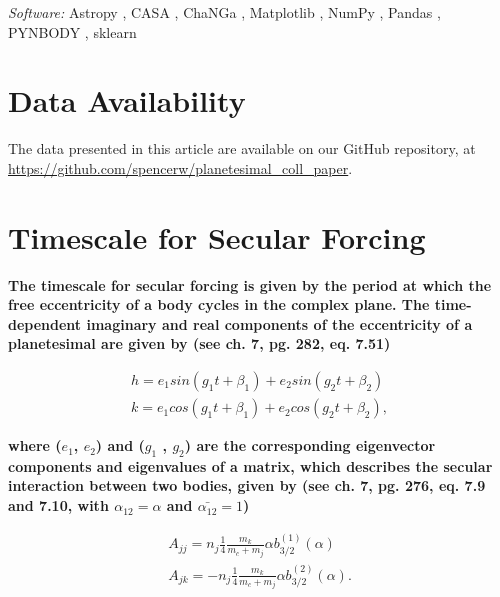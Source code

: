 \documentclass[fleqn,usenatbib]{mnras}
\begin{document}
\textit{Software:} Astropy \citep{2013A&A...558A..33A}, {\sc CASA} \citep{2007ASPC..376..127M}, {\sc ChaNGa} \citep{2008IEEEpds...ChaNGa, 2015AphCom..2..1}, Matplotlib 
\citep{2007CSE.....9...90H}, NumPy \citep{2011CSE....13b..22V}, Pandas \citep{mckinney-proc-scipy-2010}, {\sc PYNBODY} \citep{2013ascl.soft05002P}, {\sc sklearn} \citep{scikit-learn}

\section*{Data Availability}
The data presented in this article are available on our GitHub repository, at \url{https://github.com/spencerw/planetesimal_coll_paper}.




\appendix
\section{Timescale for Secular Forcing}\label{sec:sec_forcing_timescale}

\textbf{The timescale for secular forcing is given by the period at which the free eccentricity of a body cycles in the complex plane. The time-dependent imaginary and real components of 
the eccentricity of a planetesimal are given by \citet{1999ssd..book.....M} (see ch. 7, pg. 282, eq. 7.51)}

\begin{eqnarray}\label{eq:kandh}
	h = e_{1} sin (g_{1} t + \beta_{1}) + e_{2} sin (g_{2} t + \beta_{2}) \\ \nonumber
	k = e_{1} cos (g_{1} t + \beta_{1}) + e_{2} cos (g_{2} t + \beta_{2}),
\end{eqnarray}

\noindent \textbf{where  ($e_{1}$, $e_{2}$) and ($g_{1}$ , $g_{2}$) are the corresponding eigenvector components and eigenvalues of a matrix, which describes the secular interaction 
between two bodies, given by \citet{1999ssd..book.....M} (see ch. 7, pg. 276, eq. 7.9 and 7.10, with $\alpha_{12} = \alpha$ and $\bar{\alpha_{12}} = 1$)}

\begin{eqnarray}\label{eq:pert_matrix}
	A_{jj} = n_{j} \frac{1}{4} \frac{m_{k}}{m_{c} + m_{j}} \alpha b_{3/2}^{(1)} (\alpha) \\ \nonumber
	A_{jk} = -n_{j} \frac{1}{4} \frac{m_{k}}{m_{c} + m_{j}} \alpha b_{3/2}^{(2)} (\alpha).
\end{eqnarray}
\end{document}
